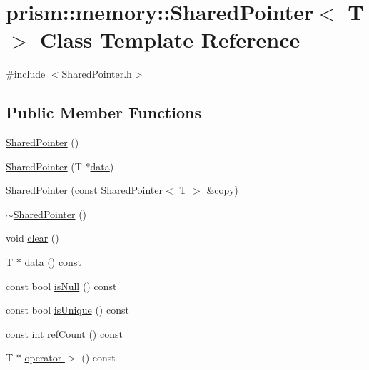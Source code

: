 \hypertarget{classprism_1_1memory_1_1_shared_pointer}{}\section{prism\+:\+:memory\+:\+:Shared\+Pointer$<$ T $>$ Class Template Reference}
\label{classprism_1_1memory_1_1_shared_pointer}


{\ttfamily \#include $<$Shared\+Pointer.\+h$>$}

\subsection*{Public Member Functions}
\begin{DoxyCompactItemize}
\item 
\hyperlink{classprism_1_1memory_1_1_shared_pointer_a5b10beef934782caeac380b48cd57474}{Shared\+Pointer} ()
\item 
\hyperlink{classprism_1_1memory_1_1_shared_pointer_a7ce4fcda36f445a2e4871400cf2fbe30}{Shared\+Pointer} (T $\ast$\hyperlink{classprism_1_1memory_1_1_shared_pointer_a5babf4e115829dc654f8736c7ea229bf}{data})
\item 
\hyperlink{classprism_1_1memory_1_1_shared_pointer_ab52d35481022308d755e614289283ee8}{Shared\+Pointer} (const \hyperlink{classprism_1_1memory_1_1_shared_pointer}{Shared\+Pointer}$<$ T $>$ \&copy)
\item 
\hyperlink{classprism_1_1memory_1_1_shared_pointer_a882cd1705b0f199d7aa5b4e4bce59b9f}{$\sim$\+Shared\+Pointer} ()
\item 
void \hyperlink{classprism_1_1memory_1_1_shared_pointer_a12ef6d4a50d8b382ed17d736c4f12704}{clear} ()
\item 
T $\ast$ \hyperlink{classprism_1_1memory_1_1_shared_pointer_a5babf4e115829dc654f8736c7ea229bf}{data} () const 
\item 
const bool \hyperlink{classprism_1_1memory_1_1_shared_pointer_ada1547c6f8784a400638a3952d047679}{is\+Null} () const 
\item 
const bool \hyperlink{classprism_1_1memory_1_1_shared_pointer_af2fb73533c3eebd94e88835436df53cb}{is\+Unique} () const 
\item 
const int \hyperlink{classprism_1_1memory_1_1_shared_pointer_a9d6e7c2643ed7ec55a63742b64af9ed9}{ref\+Count} () const 
\item 
T $\ast$ \hyperlink{classprism_1_1memory_1_1_shared_pointer_a87791b2d58b4fc9ea375bbc8d8016982}{operator-\/$>$} () const 

\end{DoxyCompactItemize}
